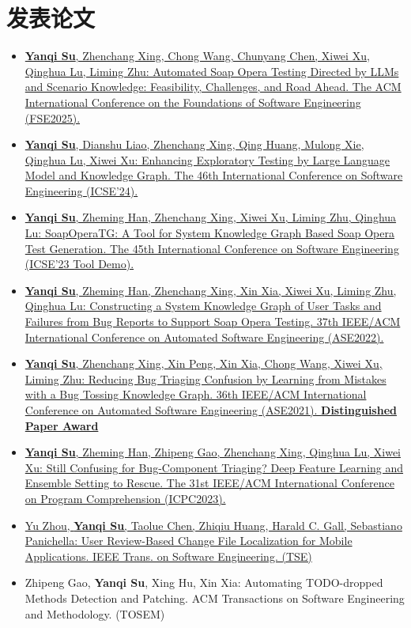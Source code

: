\documentclass[11pt,a4paper]{ctexart}
\begin{document}
\section*{发表论文}
\begin{itemize}
  \item \href{https://conf.researchr.org/home/fse-2025}{\textbf{Yanqi Su}, Zhenchang Xing, Chong Wang, Chunyang Chen, Xiwei Xu, Qinghua Lu, Liming Zhu: Automated Soap Opera Testing Directed by LLMs and Scenario Knowledge: Feasibility, Challenges, and Road Ahead. The ACM International Conference on the Foundations of Software Engineering (FSE2025). }
\item \href{https://conf.researchr.org/details/icse-2024/icse-2024-research-track/157/Enhancing-Exploratory-Testing-by-Large-Language-Model-and-Knowledge-Graph}{\textbf{Yanqi Su}, Dianshu Liao, Zhenchang Xing, Qing Huang, Mulong Xie, Qinghua Lu, Xiwei Xu:
Enhancing Exploratory Testing by Large Language Model and Knowledge Graph. The 46th International Conference on Software Engineering (ICSE'24). }
\item \href{https://ieeexplore.ieee.org/document/10172537}{\textbf{Yanqi Su}, Zheming Han, Zhenchang Xing, Xiwei Xu, Liming Zhu, Qinghua Lu:
SoapOperaTG: A Tool for System Knowledge Graph Based Soap Opera Test Generation. The 45th International Conference on Software Engineering (ICSE'23 Tool Demo).}
\item \href{https://dl.acm.org/doi/abs/10.1145/3551349.3556967}{\textbf{Yanqi Su}, Zheming Han, Zhenchang Xing, Xin Xia, Xiwei Xu, Liming Zhu, Qinghua Lu:
Constructing a System Knowledge Graph of User Tasks and Failures from Bug Reports to Support Soap Opera Testing. 37th IEEE/ACM International Conference on Automated Software Engineering (ASE2022).}
\item \href{https://ieeexplore.ieee.org/document/9678574}{\textbf{Yanqi Su}, Zhenchang Xing, Xin Peng, Xin Xia, Chong Wang, Xiwei Xu, Liming Zhu:
Reducing Bug Triaging Confusion by Learning from Mistakes with a Bug Tossing Knowledge Graph. 36th IEEE/ACM International Conference on Automated Software Engineering (ASE2021). \newline
 \hspace{0.5em}\textbf{Distinguished Paper Award}}
\item \href{https://ieeexplore.ieee.org/document/10174001}{\textbf{Yanqi Su}, Zheming Han, Zhipeng Gao, Zhenchang Xing, Qinghua Lu, Xiwei Xu:
Still Confusing for Bug-Component Triaging? Deep Feature Learning and Ensemble Setting to Rescue. The 31st IEEE/ACM International Conference on Program Comprehension (ICPC2023).} 
\item \href{https://ieeexplore.ieee.org/document/8961125}{Yu Zhou, \textbf{Yanqi Su}, Taolue Chen, Zhiqiu Huang, Harald C. Gall, Sebastiano Panichella:
User Review-Based Change File Localization for Mobile Applications. IEEE Trans. on Software Engineering. (TSE)}
\item Zhipeng Gao, \textbf{Yanqi Su}, Xing Hu, Xin Xia: Automating TODO-dropped Methods Detection and Patching. ACM Transactions on Software Engineering and Methodology. (TOSEM)
\end{itemize}
\end{document}
